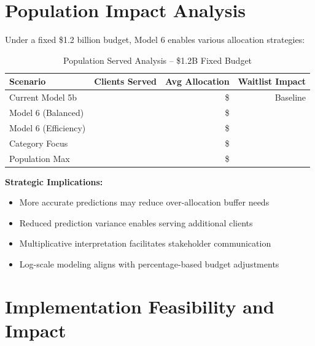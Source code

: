 \section{Population Impact Analysis}

Under a fixed \$1.2 billion budget, Model 6 enables various allocation strategies:

\begin{table}[h]
\centering
\caption{Population Served Analysis -- \$1.2B Fixed Budget}
\begin{tabular}{lrrr}
\toprule
\textbf{Scenario} & \textbf{Clients Served} & \textbf{Avg Allocation} & \textbf{Waitlist Impact} \\
\midrule
Current Model 5b & \ModelSixPopcurrentbaselineClients{} & \$\ModelSixPopcurrentbaselineAvgAlloc{} & Baseline \\
Model 6 (Balanced) & \ModelSixPopmodelbalancedClients{} & \$\ModelSixPopmodelbalancedAvgAlloc{} & \ModelSixPopmodelbalancedWaitlistChange{} \\
Model 6 (Efficiency) & \ModelSixPopmodelefficiencyClients{} & \$\ModelSixPopmodelefficiencyAvgAlloc{} & \ModelSixPopmodelefficiencyWaitlistChange{} \\
Category Focus & \ModelSixPopcategoryfocusedClients{} & \$\ModelSixPopcategoryfocusedAvgAlloc{} & \ModelSixPopcategoryfocusedWaitlistChange{} \\
Population Max & \ModelSixPoppopulationmaximizedClients{} & \$\ModelSixPoppopulationmaximizedAvgAlloc{} & \ModelSixPoppopulationmaximizedWaitlistChange{} \\
\bottomrule
\end{tabular}
\end{table}

\textbf{Strategic Implications:}
\begin{itemize}
    \item More accurate predictions may reduce over-allocation buffer needs
    \item Reduced prediction variance enables serving additional clients
    \item Multiplicative interpretation facilitates stakeholder communication
    \item Log-scale modeling aligns with percentage-based budget adjustments
\end{itemize}

\section{Implementation Feasibility and Impact}

